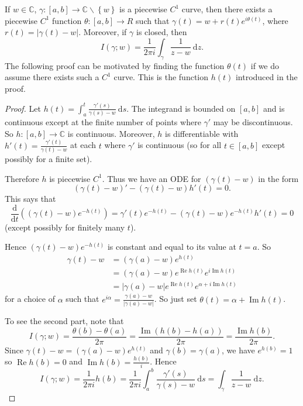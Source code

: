 \documentclass[egregdoesnotlikesansseriftitles,a4paper]{scrartcl}
\begin{document}
\begin{lemma}
      If $w \in \mathbb{C}$, $\gamma: [a,b] \rightarrow \mathbb{C} \backslash \left\{w\right\}$ is a piecewise $C^{1}$ curve, then there exists a piecewise $C^{1}$ function $\theta: [a,b] \rightarrow R
      $ such that $\gamma (t)=w+r (t)e^{i \theta (t)}$, where $r (t)=\left|\gamma (t)-w\right|$. Moreover, if $\gamma$ is closed, then \[
      I (\gamma ;w)= \frac{1}{2\pi i}\int_{\gamma}^{}\frac{1}{z-w} \ \mathrm{d}z 
      .\] The following proof can be motivated by finding the function $\theta (t)$ if we do assume there exists such a $C^{1}$ curve. This is the function $h (t)$ introduced in the proof.
      \begin{proof}
            Let $h (t)=\int_{a}^{t} \frac{\gamma' (s)}{\gamma (s)-w} \ \mathrm{d}s $. The integrand is bounded on $[a,b]$ and is continuous except at the finite number of points where $\gamma' $ may be discontinuous. So $h: [a,b] \rightarrow \mathbb{C}$ is continuous. Moreover, $h$ is differentiable with $h' (t)= \frac{\gamma' (t)}{\gamma (t)-w}$ at each $t$ where $\gamma' $ is continuous (so for all $t \in [a,b]$ except possibly for a finite set). 

            Therefore $h$ is piecewise $C^{1}$. Thus we have an ODE for $(\gamma (t)-w)$ in the form \[
            (\gamma (t)-w)' - (\gamma (t)-w)h' (t)=0
            .\] This says that \[
            \frac{\mathrm{d}}{\mathrm{d}t}\left((\gamma (t)-w) e^{-h (t)}\right)= \gamma' (t)e^{-h (t)}-(\gamma (t)-w)e^{-h (t)}h' (t)=0
            \] (except possibly for finitely many $t$).

            Hence $(\gamma (t)-w) e^{-h (t)}$ is constant and equal to its value at $t=a$. So
            \begin{align*}
               \gamma (t)-w&= (\gamma (a)-w)e^{h (t)}\\
               &=(\gamma (a)-w)e^{\operatorname{Re} h (t)}e^{i \operatorname{Im} h (t)}\\
               &=\left|\gamma (a)-w\right|e^{\operatorname{Re} h (t)}e^{\alpha+i \operatorname{Im} h (t)}
            \end{align*}
            for a choice of $\alpha$ such that $e^{i \alpha}= \frac{\gamma (a)-w}{\left|\gamma (a)-w\right|}$. So just set $\theta (t)=\alpha+ \operatorname{Im}h (t)$.

            To see the second part, note that \[
            I (\gamma;w )= \frac{\theta (b)-\theta (a)}{2\pi}= \frac{\operatorname{Im}(h (b)-h (a))}{2\pi}= \frac{\operatorname{Im}h (b)}{2\pi}
            .\] Since $\gamma (t)-w= (\gamma (a)-w) e^{h (t)}$ and $\gamma (b)=\gamma (a)$, we have $e^{h (b)}=1$ so $\operatorname{Re} h (b)=0$ and $\operatorname{Im} h (b)= \frac{h (b)}{i}$. Hence \[
            I (\gamma; w)= \frac{1}{2\pi i}h (b)=\frac{1}{2 \pi i} \int_{a}^{b} \frac{\gamma' (s)}{\gamma (s)-w}\ \mathrm{d}s =\int_{\gamma}^{} \frac{1}{z-w}\ \mathrm{d}z  
            .\] 
      \end{proof}
\end{lemma}
\end{document}
